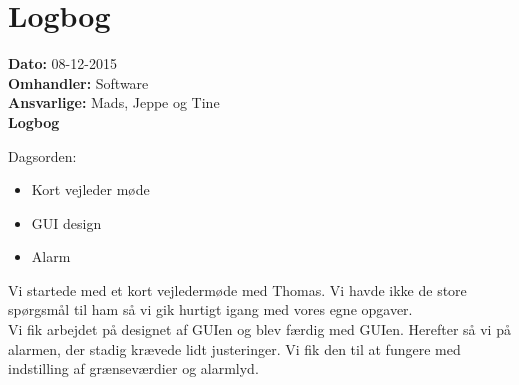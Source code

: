 \section{Logbog}

\textbf{Dato:} 08-12-2015 \\
\textbf{Omhandler:} Software \\
\textbf{Ansvarlige:} Mads, Jeppe og Tine \\
\textbf{Logbog}

Dagsorden:
\begin{itemize}
	\item Kort vejleder møde
	\item GUI design
	\item Alarm
\end{itemize}

 Vi startede med et kort vejledermøde med Thomas. Vi havde ikke de store spørgsmål til ham så vi gik hurtigt igang med vores egne opgaver. \\
 Vi fik arbejdet på designet af GUIen og blev færdig med GUIen. Herefter så vi på alarmen, der stadig krævede lidt justeringer. Vi fik den til at fungere med indstilling af grænseværdier og alarmlyd.  
